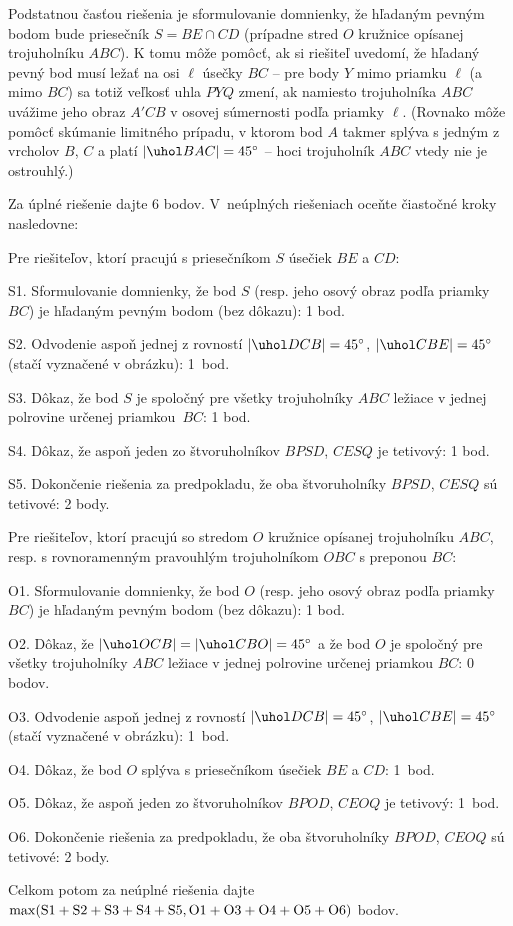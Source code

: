 {\poznamka
Podstatnou časťou riešenia je sformulovanie domnienky, že hľadaným pevným bodom bude priesečník $S=BE\cap CD$ (prípadne stred $O$ kružnice opísanej trojuholníku $ABC$). K tomu môže pomôcť, ak si riešiteľ uvedomí, že hľadaný pevný bod musí ležať na osi $\ell$ úsečky $BC$ -- pre body $Y$ mimo priamku $\ell$ (a mimo $BC$) sa totiž veľkosť uhla $PYQ$ zmení, ak namiesto trojuholníka $ABC$ uvážime jeho obraz $A'CB$ v osovej súmernosti podľa priamky $\ell$. (Rovnako môže pomôcť skúmanie limitného prípadu, v ktorom bod $A$ takmer splýva s jedným z vrcholov $B$, $C$ a platí $|\uhol BAC|=45^\circ$ -- hoci trojuholník $ABC$ vtedy nie je ostrouhlý.)


\schemaABC
Za úplné riešenie dajte 6 bodov. V~neúplných riešeniach oceňte čiastočné kroky nasledovne:

\noindent
Pre riešiteľov, ktorí pracujú s priesečníkom $S$ úsečiek $BE$ a $CD$:
\smallskip
\item{S1.} Sformulovanie domnienky, že bod $S$ (resp. jeho osový obraz podľa priamky $BC$) je hľadaným pevným bodom (bez dôkazu): 1 bod.
\item{S2.} Odvodenie aspoň jednej z rovností $|\uhol DCB|=45^\circ$, $|\uhol CBE|=45^\circ$ (stačí vyznačené v obrázku): 1~bod.
\item{S3.} Dôkaz, že bod $S$ je spoločný pre všetky trojuholníky $ABC$ ležiace v jednej polrovine určenej priamkou~$BC$: 1 bod.
\item{S4.} Dôkaz, že aspoň jeden zo štvoruholníkov $BPSD$, $CESQ$ je tetivový: 1 bod.
\item{S5.} Dokončenie riešenia za predpokladu, že oba štvoruholníky $BPSD$, $CESQ$ sú tetivové: 2 body.

\smallskip\noindent
Pre riešiteľov, ktorí pracujú so stredom $O$ kružnice opísanej trojuholníku $ABC$, resp. s rovnoramenným pravouhlým trojuholníkom $OBC$ s preponou $BC$:

\smallskip
\item{O1.} Sformulovanie domnienky, že bod $O$ (resp. jeho osový obraz podľa priamky $BC$) je hľadaným pevným bodom (bez dôkazu): 1 bod.
\item{O2.} Dôkaz, že $|\uhol OCB|=|\uhol CBO|=45^\circ$ a že bod $O$ je spoločný pre všetky trojuholníky $ABC$ ležiace v jednej polrovine určenej priamkou $BC$: 0 bodov.
\item{O3.} Odvodenie aspoň jednej z rovností $|\uhol DCB|=45^\circ$, $|\uhol CBE|=45^\circ$ (stačí vyznačené v obrázku): 1~bod.
\item{O4.} Dôkaz, že bod $O$ splýva s priesečníkom úsečiek $BE$ a $CD$: 1~bod.
\item{O5.} Dôkaz, že aspoň jeden zo štvoruholníkov $BPOD$, $CEOQ$ je tetivový: 1~bod.
\item{O6.} Dokončenie riešenia za predpokladu, že oba štvoruholníky $BPOD$, $CEOQ$ sú tetivové: 2 body.

\smallskip\noindent
Celkom potom za neúplné riešenia dajte $\rm\max(S1+S2+S3+S4+S5,O1+O3+O4+O5+O6)$ bodov.
\endschema
}

